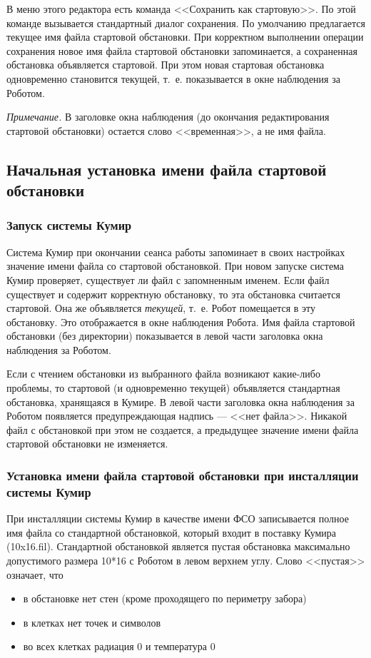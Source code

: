 В меню этого редактора есть команда <<Сохранить как стартовую>>. По этой команде вызывается стандартный диалог сохранения. По умолчанию предлагается текущее имя файла стартовой обстановки.  При корректном выполнении операции сохранения новое имя файла стартовой обстановки запоминается, а сохраненная обстановка объявляется стартовой. При этом новая стартовая обстановка одновременно становится текущей, т.~е. показывается в окне наблюдения за Роботом.

\emph{Примечание.} В заголовке окна наблюдения (до окончания  редактирования стартовой обстановки) остается слово <<временная>>, а не имя файла.

\subsection{Начальная установка имени файла стартовой обстановки}

\subsubsection{Запуск системы Кумир}

Система Кумир при окончании сеанса работы запоминает в своих настройках  значение имени файла со стартовой обстановкой.  При новом запуске система Кумир проверяет, существует ли файл с запомненным именем. Если файл существует и содержит корректную обстановку, то эта обстановка считается стартовой. Она же объявляется \emph{текущей}, т.~е. Робот помещается в эту обстановку. Это отображается в окне наблюдения Робота. Имя файла стартовой обстановки (без директории) показывается в левой части заголовка окна наблюдения за Роботом.

Если с чтением обстановки из выбранного файла возникают какие-либо проблемы, то стартовой (и одновременно текущей) объявляется стандартная обстановка, хранящаяся в Кумире. В левой части заголовка окна наблюдения за Роботом появляется предупреждающая надпись --- <<нет файла>>. Никакой файл с обстановкой при этом не создается, а предыдущее значение имени файла стартовой обстановки не изменяется.

\subsubsection{Установка имени файла стартовой обстановки  при инсталляции системы Кумир}

При инсталляции системы Кумир в качестве имени ФСО  записывается полное имя файла со стандартной обстановкой, который входит в поставку Кумира (10x16.fil). Стандартной обстановкой является пустая обстановка максимально допустимого размера 10*16 с Роботом в левом верхнем углу. Слово <<пустая>> означает, что
\begin{itemize}
\item в обстановке нет стен (кроме проходящего по периметру забора)
\item в клетках нет точек и символов
\item во всех клетках радиация 0 и температура 0
\end{itemize}

